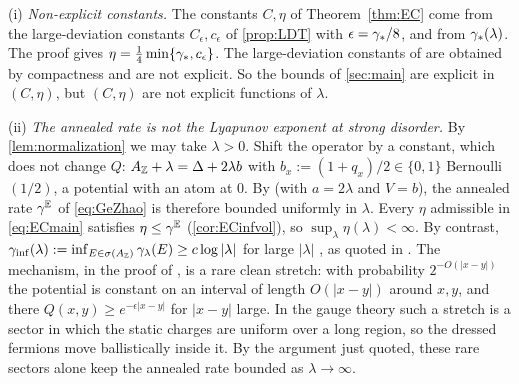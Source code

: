\begin{remark}\label{rem:rate}
(i) \emph{Non-explicit constants.}  The constants $C,\eta$ of Theorem~\ref{thm:EC} come from the
large-deviation constants $C_\epsilon,c_\epsilon$ of \cref{prop:LDT} with $\epsilon=\gamma_*/8$, and from
$\gamma_*(\lambda)$.  The proof gives $\eta=\tfrac14\min\{\gamma_*,c_\epsilon\}$.  The large-deviation constants
of \cite{Bucaj2019,MaceraSodin2022} are obtained by compactness and are not explicit.  So the bounds of
\cref{sec:main} are explicit in $(C,\eta)$, but $(C,\eta)$ are not explicit functions of $\lambda$.

(ii) \emph{The annealed rate is not the Lyapunov exponent at strong disorder.}  By
\cref{lem:normalization} we may take $\lambda>0$.  Shift the operator by a constant, which does not
change $Q$: $A_{\mathbb{Z}}+\lambda=\Delta+2\lambda b$ with $b_x:=(1+q_x)/2\in\{0,1\}$ Bernoulli$(1/2)$, a potential
with an atom at $0$.  By \cite[Thm.~1.2]{Macera2023} (with $a=2\lambda$ and $V=b$), the annealed rate
$\gamma^{\mathbb{E}}$ of \eqref{eq:GeZhao} is therefore bounded uniformly in $\lambda$.  Every $\eta$ admissible in
\eqref{eq:ECmain} satisfies $\eta\le\gamma^{\mathbb{E}}$ (\cref{cor:ECinfvol}), so $\sup_{\lambda}\eta(\lambda)<\infty$.  By
contrast, $\gamma_{\inf}(\lambda):=\inf_{E\in\sigma(A_{\mathbb{Z}})}\gamma_\lambda(E)\ge c\log|\lambda|$ for large $|\lambda|$
\cite{MartinelliMicheli1987}, as quoted in \cite{Macera2023}.  The mechanism, in the proof of \cite[Thm.~1.2]{Macera2023}, is a rare clean
stretch: with probability $2^{-O(|x-y|)}$ the potential is constant on an interval of length $O(|x-y|)$
around $x,y$, and there $Q(x,y)\ge e^{-\epsilon|x-y|}$ for $|x-y|$ large.  In the gauge theory such a
stretch is a sector in which the static charges are uniform over a long region, so the dressed fermions
move ballistically inside it.  By the argument just quoted, these rare sectors alone keep the annealed
rate bounded as $\lambda\to\infty$.


\end{remark}
